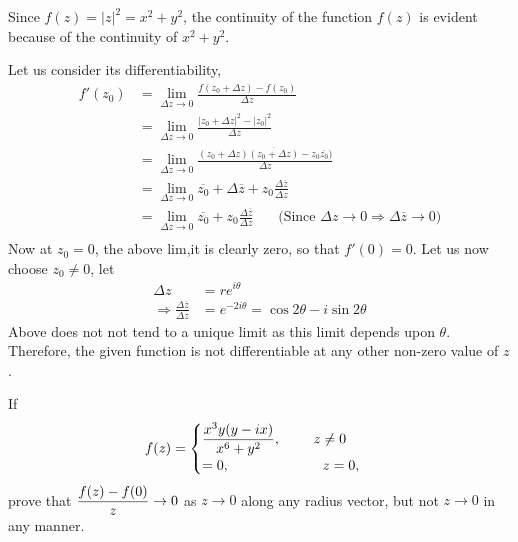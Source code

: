 \begin{solution}
Since $f(z)=|z|^2 = x^2+y^2$, the continuity of the function $f(z)$ is evident because of the continuity of $x^2+y^2$. 

Let us consider its differentiability,
\begin{align*}
        f'(z_0) &= \lim_{\Delta z \rightarrow 0} \frac{f(z_0 + \Delta z)-f(z_0) }{\Delta z} \\
        &= \lim_{\Delta z \rightarrow 0} \frac{|z_0 + \Delta z|^2-|z_0|^2 }{\Delta z} \\
        &= \lim_{\Delta z \rightarrow 0} \frac{(z_0 + \Delta z)\overline{(z_0 + \Delta z)}-z_0\overline{z_0}) }{\Delta z} \\
        &= \lim_{\Delta z \rightarrow 0} \overline{z_0} + \Delta \overline{z} + z_0 \frac{\Delta \overline{z}}{\Delta z} \\
        &= \lim_{\Delta z \rightarrow 0} \overline{z_0} + z_0 \frac{\Delta \overline{z}}{\Delta z}~~~~~~~~\text{(Since $\Delta z \rightarrow 0 \Rightarrow \Delta \overline{z} \rightarrow 0 $)} \\
\end{align*}
Now at $z_0=0$, the above lim,it is clearly zero, so that $f'(0)=0$. Let us now choose $z_0 \neq 0$, let
\begin{align*}
\Delta z &= r e^{i\theta} \\
\Rightarrow \frac{\Delta \overline{z}}{\Delta z} &= e^{-2i\theta} = \cos 2\theta - i \sin 2\theta
\end{align*}
Above does not not tend to a unique limit as this limit depends upon $\theta$. Therefore, the given function is not differentiable at any other non-zero value of $z$.
\end{solution}
\begin{example}
If 
\[
f(z)=
\begin{cases}
\displaystyle \frac{x^3y(y-ix)}{x^6+y^2},~~~~~~~ z \neq 0 \\
=0,~~~~~~~~~~~~~~~~~~~~ z=0,
\end{cases}
\]
prove that $\displaystyle \frac{f(z)-f(0)}{z} \rightarrow 0$ as $z \rightarrow 0$ along any radius vector, but not $z \rightarrow 0$ in any manner.
\end{example}
